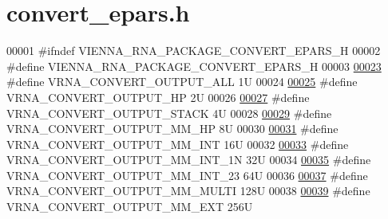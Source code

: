 \hypertarget{convert__epars_8h_source}{}\section{convert\+\_\+epars.\+h}
\label{convert__epars_8h_source}

\begin{DoxyCode}
00001 \textcolor{preprocessor}{#ifndef VIENNA\_RNA\_PACKAGE\_CONVERT\_EPARS\_H}
00002 \textcolor{preprocessor}{#define VIENNA\_RNA\_PACKAGE\_CONVERT\_EPARS\_H}
00003 
\mbox{\hyperlink{group__energy__parameters__convert_ga8dc6aee5a806c49b71557152f9616bc4}{00023}} \textcolor{preprocessor}{#define VRNA\_CONVERT\_OUTPUT\_ALL           1U}
00024 
\mbox{\hyperlink{group__energy__parameters__convert_gaf66fe2cb11dfcfd32d791049c254a8a4}{00025}} \textcolor{preprocessor}{#define VRNA\_CONVERT\_OUTPUT\_HP            2U}
00026 
\mbox{\hyperlink{group__energy__parameters__convert_gad23522d63f8d4c50d5a5deee9bee3ef2}{00027}} \textcolor{preprocessor}{#define VRNA\_CONVERT\_OUTPUT\_STACK         4U}
00028 
\mbox{\hyperlink{group__energy__parameters__convert_gaa892c7b4957459090f3e08da298cc347}{00029}} \textcolor{preprocessor}{#define VRNA\_CONVERT\_OUTPUT\_MM\_HP         8U}
00030 
\mbox{\hyperlink{group__energy__parameters__convert_ga4ff223fb1f9c62cd92d9ab811ad03d55}{00031}} \textcolor{preprocessor}{#define VRNA\_CONVERT\_OUTPUT\_MM\_INT        16U}
00032 
\mbox{\hyperlink{group__energy__parameters__convert_gaf5d3743219f83c6348155cd81e755bbb}{00033}} \textcolor{preprocessor}{#define VRNA\_CONVERT\_OUTPUT\_MM\_INT\_1N     32U}
00034 
\mbox{\hyperlink{group__energy__parameters__convert_ga78382ec622ba99e0ac2262317bdd7316}{00035}} \textcolor{preprocessor}{#define VRNA\_CONVERT\_OUTPUT\_MM\_INT\_23     64U}
00036 
\mbox{\hyperlink{group__energy__parameters__convert_gae67af9f1cdf7baf2865481282a5d1034}{00037}} \textcolor{preprocessor}{#define VRNA\_CONVERT\_OUTPUT\_MM\_MULTI      128U}
00038 
\mbox{\hyperlink{group__energy__parameters__convert_gaf14ead7ef1fdbe725ade653750fc51e3}{00039}} \textcolor{preprocessor}{#define VRNA\_CONVERT\_OUTPUT\_MM\_EXT        256U}

\end{DoxyCode}
